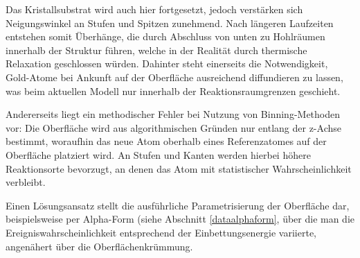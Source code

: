 Das Kristallsubstrat wird auch hier fortgesetzt, jedoch verstärken sich Neigungswinkel an Stufen und Spitzen zunehmend.
Nach längeren Laufzeiten entstehen somit Überhänge, die durch Abschluss von unten zu Hohlräumen innerhalb der Struktur führen, welche in der Realität durch thermische Relaxation geschlossen würden.
Dahinter steht einerseits die Notwendigkeit, Gold-Atome bei Ankunft auf der Oberfläche ausreichend diffundieren zu lassen, was beim aktuellen Modell nur innerhalb der Reaktionsraumgrenzen geschieht.

Andererseits liegt ein methodischer Fehler bei Nutzung von Binning-Methoden vor:
Die Oberfläche wird aus algorithmischen Gründen nur entlang der z-Achse bestimmt, woraufhin das neue Atom oberhalb eines Referenzatomes auf der Oberfläche platziert wird.
An Stufen und Kanten werden hierbei höhere Reaktionsorte bevorzugt, an denen das Atom mit statistischer Wahrscheinlichkeit verbleibt.

Einen Lösungsansatz stellt die ausführliche Parametrisierung der Oberfläche dar, beispielsweise per Alpha-Form (siehe Abschnitt \ref{dataalphaform}, über die man die Ereigniswahrscheinlichkeit entsprechend der Einbettungsenergie variierte, angenähert über die Oberflächenkrümmung.
